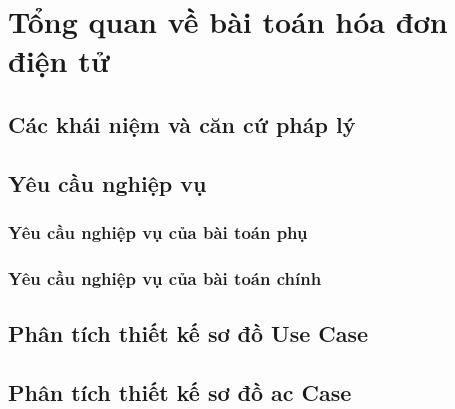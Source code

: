 \documentclass{report} %
\begin{document}
\chapter{Tổng quan về bài toán hóa đơn điện tử}
% 
\section{Các khái niệm và căn cứ pháp lý}
% 

\section{Yêu cầu nghiệp vụ}
% 

\subsection{Yêu cầu nghiệp vụ của bài toán phụ}


\subsection{Yêu cầu nghiệp vụ của bài toán chính}
% 
\section{Phân tích thiết kế sơ đồ Use Case}
\section{Phân tích thiết kế sơ đồ ac Case}
% 

\end{document}
